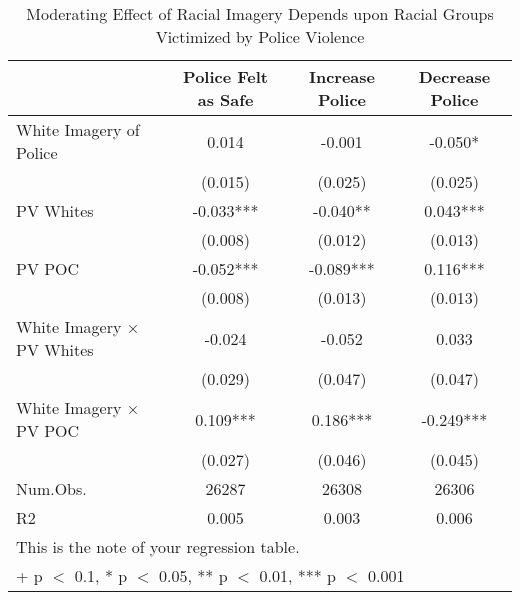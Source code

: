 \begin{table}

\caption{Moderating Effect of Racial Imagery Depends upon Racial Groups Victimized by Police Violence}
\centering
\begin{tabular}[t]{lccc}
\toprule
  & Police Felt as Safe & Increase Police & Decrease Police\\
\midrule
White Imagery of Police & 0.014 & -0.001 & -0.050*\\
 & (0.015) & (0.025) & (0.025)\\
PV Whites & -0.033*** & -0.040** & 0.043***\\
 & (0.008) & (0.012) & (0.013)\\
PV POC & -0.052*** & -0.089*** & 0.116***\\
 & (0.008) & (0.013) & (0.013)\\
White Imagery × PV Whites & -0.024 & -0.052 & 0.033\\
 & (0.029) & (0.047) & (0.047)\\
White Imagery × PV POC & 0.109*** & 0.186*** & -0.249***\\
 & (0.027) & (0.046) & (0.045)\\
\midrule
Num.Obs. & 26287 & 26308 & 26306\\
R2 & 0.005 & 0.003 & 0.006\\
\bottomrule
\multicolumn{4}{l}{\rule{0pt}{1em}This is the note of your regression table.}\\
\multicolumn{4}{l}{\rule{0pt}{1em}+ p $<$ 0.1, * p $<$ 0.05, ** p $<$ 0.01, *** p $<$ 0.001}\\
\end{tabular}
\end{table}
